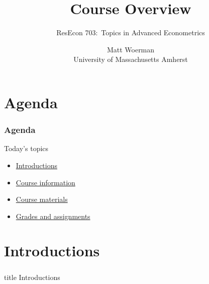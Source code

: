 \documentclass{beamer}
\title[Course Overview]{Course Overview}
\author[ResEcon 703:\ Advanced Econometrics]{ResEcon 703:\ Topics in Advanced Econometrics}
\date{Matt Woerman\\University of Massachusetts Amherst}
\begin{document}
{ 
\begin{frame}[noframenumbering]
    \titlepage
\end{frame}
}

\section{Agenda}
\begin{frame}\frametitle{Agenda}
    Today's topics
    \begin{itemize}
    	\item \hyperlink{page.\getpagerefnumber{introductions}}{Introductions}
        \item \hyperlink{page.\getpagerefnumber{information}}{Course information}
        \item \hyperlink{page.\getpagerefnumber{materials}}{Course materials}
        \item \hyperlink{page.\getpagerefnumber{grades}}{Grades and assignments}
    \end{itemize}
\end{frame}

\section{Introductions}
\label{introductions}
\begin{frame}\frametitle{}
    \vfill
    \centering
    \begin{beamercolorbox}[center]{title}
        \Large Introductions
    \end{beamercolorbox}
    \vfill
\end{frame}
\end{document}
